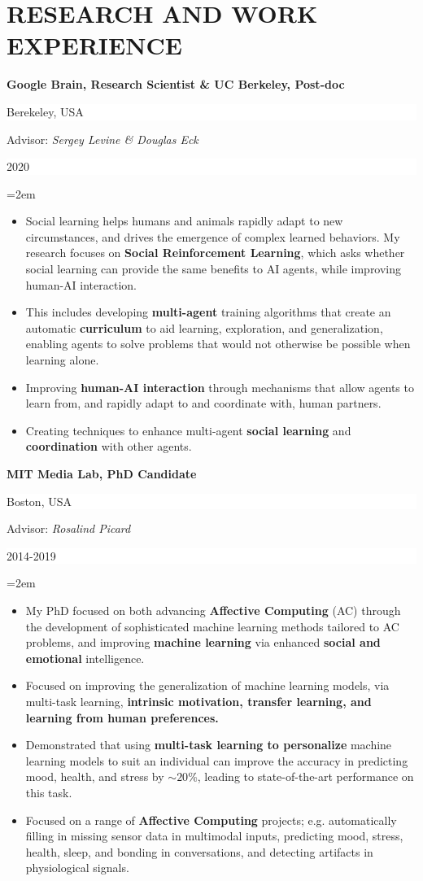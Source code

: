 \documentclass[paper=letter,fontsize=11pt]{scrartcl} %
\newcommand{\sepspace}{\vspace*{1em}}		%
\newcommand{\NewPart}[2]{\section*{\uppercase{#1} #2}}
\newcommand{\ResearchEntry}[5]{
		\noindent \textbf{#1} \hfill      %
		\colorbox{White}{%
			\parbox{10em}{%
			\hfill\color{Black}#2}} \par  %
		\noindent Advisor: \textit{#3} \hfill      %
		\colorbox{White}{%
			\parbox{6em}{%
			\hfill\color{Black}#4}} \par  %
		\noindent\hangindent=2em\hangafter=0 \small #5 %
		\normalsize \par}
\begin{document}
\NewPart{Research and Work Experience}{}
\ResearchEntry{Google Brain, Research Scientist \& UC Berkeley, Post-doc}{Berekeley, USA}{Sergey Levine \& Douglas Eck}{2020}
{\begin{itemize}
    \item Social learning helps humans and animals rapidly adapt to new circumstances, and drives the emergence of complex learned behaviors. My research focuses on \textbf{Social Reinforcement Learning}, which asks whether social learning can provide the same benefits to AI agents, while improving human-AI interaction. 
    \item This includes developing \textbf{multi-agent} training algorithms that create an automatic \textbf{curriculum} to aid learning, exploration, and generalization, enabling agents to solve problems that would not otherwise be possible when learning alone.
    \item Improving \textbf{human-AI interaction} through mechanisms that allow agents to learn from, and rapidly adapt to and coordinate with, human partners. 
    \item Creating techniques to enhance multi-agent \textbf{social learning} and \textbf{coordination} with other agents.
\end{itemize}}
\sepspace

\ResearchEntry{MIT Media Lab, PhD Candidate}{Boston, USA}{Rosalind Picard}{2014-2019}
{\begin{itemize}
    \item My PhD focused on both advancing \textbf{Affective Computing} (AC) through the development of sophisticated machine learning methods tailored to AC problems, and improving \textbf{machine learning} via enhanced \textbf{social and emotional} intelligence. 
    \item Focused on improving the generalization of machine learning models, via multi-task learning, \textbf{intrinsic motivation, transfer learning, and learning from human preferences.}
    \item Demonstrated that using \textbf{multi-task learning to personalize} machine learning models to suit an individual can improve the accuracy in predicting mood, health, and stress by $\sim20$\%, leading to state-of-the-art performance on this task.
    \item Focused on a range of \textbf{Affective Computing} projects; e.g. automatically filling in missing sensor data in multimodal inputs, predicting mood, stress, health, sleep, and bonding in conversations, and detecting artifacts in physiological signals.
\end{itemize}}
\sepspace
\end{document}
